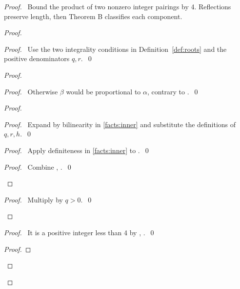 \begin{proof}
\pfsketch\ Bound the product of two nonzero integer pairings by 4.
Reflections preserve length, then Theorem B classifies each component.
\begin{proof}
\begin{proof}\pf\ Use the two integrality conditions in
Definition~\ref{def:roots} and the positive denominators $q,r$.~\qed\end{proof}
\begin{proof}
\begin{proof}\pf\ Otherwise $\beta$ would be proportional to $\alpha$,
contrary to .~\qed\end{proof}
\begin{proof}
\begin{proof}\pf\ Expand by bilinearity in \ref{facts:inner} and
substitute the definitions of $q,r,h$.~\qed\end{proof}
\begin{proof}\pf\ Apply definiteness in \ref{facts:inner} to
.~\qed\end{proof}
\qedstep
\begin{proof}\pf\ Combine ,
.~\qed\end{proof}
\end{proof}
\qedstep
\begin{proof}\pf\ Multiply  by $q>0$.~\qed\end{proof}
\end{proof}
\begin{proof}\pf\ It is a positive integer less than 4 by
, .~\qed\end{proof}
\begin{proof}

\end{proof}
\end{proof}
\end{proof}

